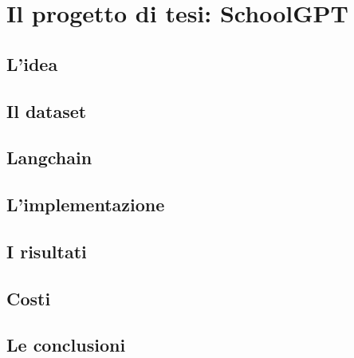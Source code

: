 \chapter{Il progetto di tesi: SchoolGPT}
\section{L'idea}

\section{Il dataset}

\section{Langchain}

\section{L'implementazione}

\section{I risultati}
\section{Costi}

\section{Le conclusioni}